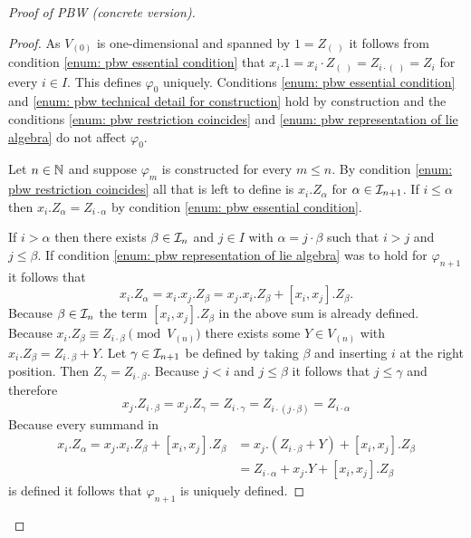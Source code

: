 \begin{proof}[Proof of PBW (concrete version)]
\begin{proof}
  As $V_{(0)}$ is one-dimensional and spanned by $1 = Z_{(\;)}$ it follows from condition \ref{enum: pbw essential condition} that $x_i.1 = x_i \cdot Z_{(\;)} = Z_{i \cdot (\;)} = Z_i$ for every $i \in I$. This defines $\varphi_0$ uniquely. Conditions \ref{enum: pbw essential condition} and \ref{enum: pbw technical detail for construction} hold by construction and the conditions \ref{enum: pbw restriction coincides} and \ref{enum: pbw representation of lie algebra} do not affect $\varphi_0$.
  
  Let $n \in \mathbb{N}$ and suppose $\varphi_m$ is constructed for every $m \leq n$. By condition \ref{enum: pbw restriction coincides} all that is left to define is $x_i.Z_\alpha$ for $\alpha \in \mathcal{I}_{n+1}$. If $i \leq \alpha$ then $x_i.Z_\alpha = Z_{i \cdot \alpha}$ by condition \ref{enum: pbw essential condition}.
  
  If $i > \alpha$ then there exists $\beta \in \mathcal{I}_n$ and $j \in I$ with $\alpha = j \cdot \beta$ such that $i > j$ and $j \leq \beta$. If condition \ref{enum: pbw representation of lie algebra} was to hold for $\varphi_{n+1}$ it follows that
  \begin{equation}\label{eqn: action defined as lie action}
   x_i.Z_\alpha
   = x_i.x_j.Z_\beta
   = x_j.x_i.Z_\beta + [x_i, x_j].Z_\beta.
  \end{equation}
  Because $\beta \in \mathcal{I}_n$ the term $[x_i, x_j].Z_\beta$ in the above sum is already defined. Because $x_i.Z_\beta \equiv Z_{i \cdot \beta} \pmod{V_{(n)}}$ there exists some $Y \in V_{(n)}$ with $x_i.Z_\beta = Z_{i \cdot \beta} + Y$. Let $\gamma \in \mathcal{I}_{n+1}$ be defined by taking $\beta$ and inserting $i$ at the right position. Then $Z_\gamma = Z_{i \cdot \beta}$. Because $j < i$ and $j \leq \beta$ it follows that $j \leq \gamma$ and therefore 
  \[
   x_j.Z_{i \cdot \beta}
   = x_j.Z_\gamma
   = Z_{i \cdot \gamma}
   = Z_{i \cdot (j \cdot \beta)}
   = Z_{i \cdot \alpha}
  \]
  Because every summand in
  \begin{equation}\label{eqn: I really wish Humphreys had explained this}
   \begin{aligned}
    x_i.Z_\alpha
    = x_j.x_i.Z_\beta + [x_i, x_j].Z_\beta
    &= x_j.(Z_{i \cdot \beta} + Y) + [x_i, x_j].Z_\beta \\
    &= Z_{i \cdot \alpha} + x_j.Y + [x_i, x_j].Z_\beta
   \end{aligned}
  \end{equation}
  is defined it follows that $\varphi_{n+1}$ is uniquely defined.
  

\end{proof}
\end{proof}
